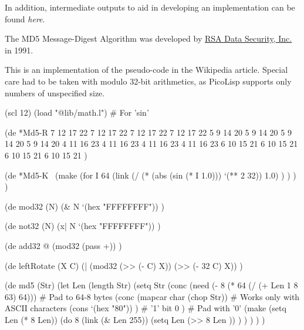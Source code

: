 In addition, intermediate outputs to aid in developing an implementation
can be found \emph{here}.

The MD5 Message-Digest Algorithm was developed by
\href{http://en.wikipedia.org/wiki/RSA\_SecurityRSA}{RSA Data Security,
Inc.} in 1991.


\begin{wideverbatim}

This is an implementation of the pseudo-code in the Wikipedia article. Special
care had to be taken with modulo 32-bit arithmetics, as PicoLisp supports only
numbers of unspecified size.

(scl 12)
(load "@lib/math.l")  # For 'sin'

(de *Md5-R
   7 12 17 22  7 12 17 22  7 12 17 22  7 12 17 22
   5  9 14 20  5  9 14 20  5  9 14 20  5  9 14 20
   4 11 16 23  4 11 16 23  4 11 16 23  4 11 16 23
   6 10 15 21  6 10 15 21  6 10 15 21  6 10 15 21 )

(de *Md5-K
   ~(make
      (for I 64
         (link
            (/ (* (abs (sin (* I 1.0))) `(** 2 32)) 1.0) ) ) ) )

(de mod32 (N)
   (\& N `(hex "FFFFFFFF")) )

(de not32 (N)
   (x| N `(hex "FFFFFFFF")) )

(de add32 @
   (mod32 (pass +)) )

(de leftRotate (X C)
   (| (mod32 (>> (- C) X)) (>> (- 32 C) X)) )

(de md5 (Str)
   (let Len (length Str)
      (setq Str
         (conc
            (need
               (- 8 (* 64 (/ (+ Len 1 8 63) 64)))  # Pad to 64-8 bytes
               (conc
                  (mapcar char (chop Str))   # Works only with ASCII characters
                  (cons `(hex "80")) )       # '1' bit
               0 )                           # Pad with '0'
            (make
               (setq Len (* 8 Len))
               (do 8
                  (link (\& Len 255))
                  (setq Len (>> 8 Len )) ) ) ) ) )

\end{wideverbatim}


